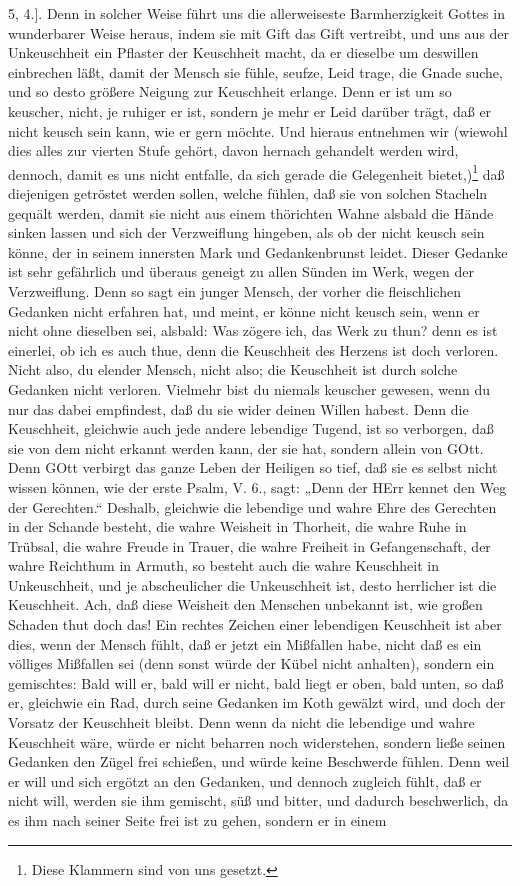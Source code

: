5, 4.]. Denn in solcher Weise führt uns die allerweiseste Barmherzigkeit Gottes in wunderbarer Weise heraus, indem sie mit Gift das Gift vertreibt, und uns aus der Unkeuschheit ein Pflaster der Keuschheit macht, da er dieselbe um deswillen einbrechen läßt, damit der Mensch sie fühle, seufze, Leid trage, die Gnade suche, und so desto größere Neigung zur Keuschheit erlange. Denn er ist um so keuscher, nicht, je ruhiger er ist, sondern je mehr er Leid darüber trägt, daß er nicht keusch sein kann, wie er gern möchte. Und hieraus entnehmen wir (wiewohl dies alles zur vierten Stufe gehört, davon hernach gehandelt werden wird, dennoch, damit es uns nicht entfalle, da sich gerade die Gelegenheit bietet,)\footnote{Diese Klammern sind von uns gesetzt.} daß diejenigen getröstet werden sollen, welche fühlen, daß sie von solchen Stacheln gequält werden, damit sie nicht aus einem thörichten Wahne alsbald die Hände sinken lassen und sich der Verzweiflung hingeben, als ob der nicht keusch sein könne, der in seinem innersten Mark und Gedankenbrunst leidet. Dieser Gedanke ist sehr gefährlich und überaus geneigt zu allen Sünden im Werk, wegen der Verzweiflung. Denn so sagt ein junger Mensch, der vorher die fleischlichen Gedanken nicht erfahren hat, und meint, er könne nicht keusch sein, wenn er nicht ohne dieselben sei, alsbald: Was zögere ich, das Werk zu thun? denn es ist einerlei, ob ich es auch thue, denn die Keuschheit des Herzens ist doch verloren. Nicht also, du elender Mensch, nicht also; die Keuschheit ist durch solche Gedanken nicht verloren. Vielmehr bist du niemals keuscher gewesen, wenn du nur das dabei empfindest, daß du sie wider deinen Willen habest. Denn die Keuschheit, gleichwie auch jede andere lebendige Tugend, ist so verborgen, daß sie von dem nicht erkannt werden kann, der sie hat, sondern allein von GOtt. Denn GOtt verbirgt das ganze Leben der Heiligen so tief, daß sie es selbst nicht wissen können, wie der erste Psalm, V. 6., sagt: „Denn der HErr kennet den Weg der Gerechten.“ Deshalb, gleichwie die lebendige und wahre Ehre des Gerechten in der Schande besteht, die wahre Weisheit in Thorheit, die wahre Ruhe in Trübsal, die wahre Freude in Trauer, die wahre Freiheit in Gefangenschaft, der wahre Reichthum in Armuth, so besteht auch die wahre Keuschheit in Unkeuschheit, und je abscheulicher die Unkeuschheit ist, desto herrlicher ist die Keuschheit. Ach, daß diese Weisheit den Menschen unbekannt ist, wie großen Schaden thut doch das! Ein rechtes Zeichen einer lebendigen Keuschheit ist aber dies, wenn der Mensch fühlt, daß er jetzt ein Mißfallen habe, nicht daß es ein völliges Mißfallen sei (denn sonst würde der Kübel nicht anhalten), sondern ein gemischtes: Bald will er, bald will er nicht, bald liegt er oben, bald unten, so daß er, gleichwie ein Rad, durch seine Gedanken im Koth gewälzt wird, und doch der Vorsatz der Keuschheit bleibt. Denn wenn da nicht die lebendige und wahre Keuschheit wäre, würde er nicht beharren noch widerstehen, sondern ließe seinen Gedanken den Zügel frei schießen, und würde keine Beschwerde fühlen. Denn weil er will und sich ergötzt an den Gedanken, und dennoch zugleich fühlt, daß er nicht will, werden sie ihm gemischt, süß und bitter, und dadurch beschwerlich, da es ihm nach seiner Seite frei ist zu gehen, sondern er in einem 